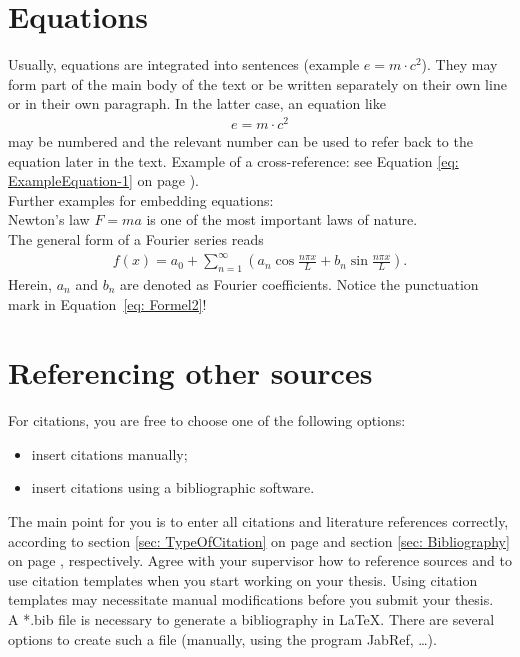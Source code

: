 \section{Equations}
Usually, equations are integrated into sentences (example $e=m\cdot c^2$). They may form part of the main body of the text or be written separately on their own line or in their own paragraph. In the latter case, an equation like
\begin{align}
	e=m\cdot c^2
	\label{eq: ExampleEquation-1}
\end{align}
may be numbered and the relevant number can be used to refer back to the equation later in the text. Example of a cross-reference: see Equation \ref{eq: ExampleEquation-1} on page \pageref{eq: ExampleEquation-1}).
\vspace{6pt}\\
Further examples for embedding equations:
\\
Newton's law $F=ma$ is one of the most important laws of nature.
\\
The general form of a Fourier series reads
%
\begin{align}
f(x)=a_0 +\sum_{n=1}^\infty \left( a_n \cos\frac{n\pi x}{L} + b_n \sin\frac{n\pi x}{L} \right) .
\label{eq: Formel2}
\end{align}
%
Herein, $a_n$ and $b_n$ are denoted as Fourier coefficients. Notice the punctuation mark
in Equation~\ref{eq: Formel2}!

\section{Referencing other sources}
For citations, you are free to choose one of the following options:
\begin{itemize}
	\item insert citations manually;
	\item insert citations using a bibliographic software.
\end{itemize}
The main point for you is to enter all citations and literature references correctly, \ie according to section \ref{sec: TypeOfCitation} on page \pageref{sec: TypeOfCitation} and section \ref{sec: Bibliography} on page \pageref{sec: Bibliography}, respectively. Agree with your supervisor how to reference sources and to use citation templates when you start working on your thesis. Using citation templates may necessitate manual modifications before you submit your thesis.\\
A *.bib file is necessary to generate a bibliography in {\LaTeX}. There are several options to create such a file (manually, using the program JabRef, \dots).

